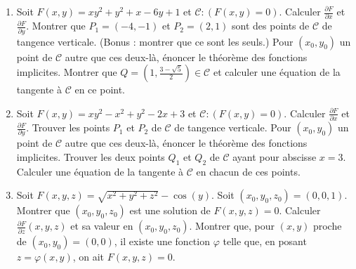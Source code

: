 \documentclass[11pt, class=report,crop=false]{standalone}
\begin{document}
\begin{miniexercices}
\sauteligne
\begin{enumerate}
    
  \item Soit $F(x,y)=xy^2+y^2+x-6y+1$ et $\mathcal{C} : (F(x,y)=0)$. 
  Calculer $\frac{\partial F}{\partial x}$ et $\frac{\partial F}{\partial y}$.
  Montrer que $P_1 = (-4,-1)$ et $P_2 = (2,1)$ sont des points de $\mathcal{C}$ de tangence verticale. (Bonus : montrer que ce sont les seuls.) 
  Pour $(x_0,y_0)$ un point de $\mathcal{C}$ autre que ces deux-là, énoncer le théorème des fonctions implicites.
  Montrer que $Q = (1,\frac{3-\sqrt5}{2}) \in \mathcal{C}$ et calculer une équation de la tangente à $\mathcal{C}$ en ce point.
  
  \item Soit $F(x,y)=xy^2-x^2+y^2-2x+3$ et $\mathcal{C} : (F(x,y)=0)$. 
  Calculer $\frac{\partial F}{\partial x}$ et $\frac{\partial F}{\partial y}$.
  Trouver les points $P_1$ et $P_2$ de $\mathcal{C}$ de tangence verticale.
  Pour $(x_0,y_0)$ un point de $\mathcal{C}$ autre que ces deux-là, énoncer le théorème des fonctions implicites.
  Trouver les deux points $Q_1$ et $Q_2$ de $\mathcal{C}$ ayant pour abscisse $x=3$. Calculer  
   une équation de la tangente à $\mathcal{C}$ en chacun de ces points.
  
  \item Soit $F(x,y,z) = \sqrt{x^2+y^2+z^2}-\cos(y)$.
  Soit $(x_0,y_0,z_0)=(0,0,1)$. 
  Montrer que $(x_0,y_0,z_0)$ est une solution de $F(x,y,z)=0$.
  Calculer $\frac{\partial F}{\partial z}(x,y,z)$ et sa valeur en $(x_0,y_0,z_0)$.
  Montrer que, pour $(x,y)$ proche de $(x_0,y_0)=(0,0)$, il existe une fonction $\varphi$
  telle que, en posant $z=\varphi(x,y)$, on ait $F(x,y,z)=0$.
  
\end{enumerate}
\end{miniexercices}





\finchapitre 
\end{document}
